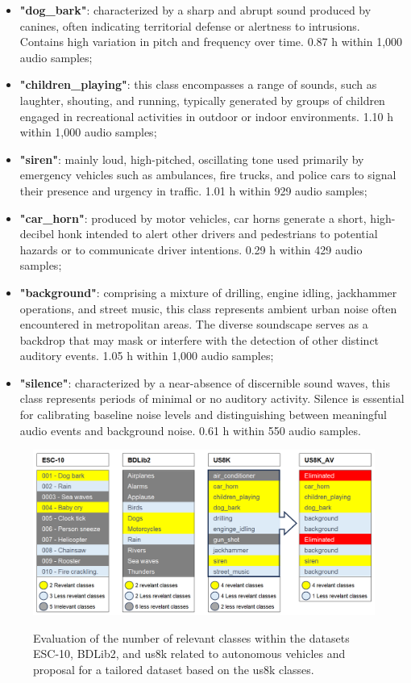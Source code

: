 \begin{itemize}
    \item \textbf{"dog\_bark"}: characterized by a sharp and abrupt sound produced by canines, often indicating territorial defense or alertness to intrusions. Contains high variation in pitch and frequency over time. 0.87 h within 1,000 audio samples;
    \item \textbf{"children\_playing"}: this class encompasses a range of sounds, such as laughter, shouting, and running, typically generated by groups of children engaged in recreational activities in outdoor or indoor environments. 1.10 h within 1,000 audio samples;
    \item \textbf{"siren"}: mainly loud, high-pitched, oscillating tone used primarily by emergency vehicles such as ambulances, fire trucks, and police cars to signal their presence and urgency in traffic. 1.01 h within 929 audio samples;
    \item \textbf{"car\_horn"}: produced by motor vehicles, car horns generate a short, high-decibel honk intended to alert other drivers and pedestrians to potential hazards or to communicate driver intentions. 0.29 h within 429 audio samples;
    \item \textbf{"background"}: comprising a mixture of drilling, engine idling, jackhammer operations, and street music, this class represents ambient urban noise often encountered in metropolitan areas. The diverse soundscape serves as a backdrop that may mask or interfere with the detection of other distinct auditory events. 1.05 h within 1,000 audio samples;
    \item \textbf{"silence"}: characterized by a near-absence of discernible sound waves, this class represents periods of minimal or no auditory activity. Silence is essential for calibrating baseline noise levels and distinguishing between meaningful audio events and background noise. 0.61 h within 550 audio samples.
\end{itemize}


\begin{figure}[htbp]
    \raggedright
        \caption{Evaluation of the number of relevant classes within the datasets ESC-10, BDLib2, and \gls{us8k} related to autonomous vehicles and proposal for a tailored dataset based on the \gls{us8k} classes.}
        \includegraphics[width=1\textwidth]{resources/images/050-methods/Methods_dataset_US8K_AV.png}
        \label{fig:methods_dataset_US8K_AV}
\end{figure}

